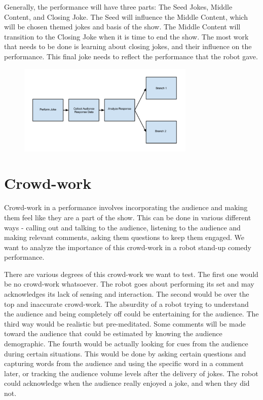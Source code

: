 \documentclass[onecolumn, draftclsnofoot,10pt, compsoc]{IEEEtran}
\begin{document}
Generally, the performance will have three parts: The Seed Jokes, Middle Content, and Closing Joke. The Seed will influence the Middle Content, which will be chosen themed jokes and basis of the show. The Middle Content will transition to the Closing Joke when it is time to end the show. The most work that needs to be done is learning about closing jokes, and their influence on the performance. This final joke needs to reflect the performance that the robot gave.
\begin{figure}[H]
  \centering
  \includegraphics[width=0.75\textwidth,height=0.75\textheight,keepaspectratio]{fig1}
  \caption{}
\end{figure}

\section{Crowd-work}
Crowd-work in a performance involves incorporating the audience and making them feel like they are a part of the show. This can be done in various different ways -  calling out and talking to the audience, listening to the audience and making relevant comments, asking them questions to keep them engaged. We want to analyze the importance of this crowd-work in a robot stand-up comedy performance. 

There are various degrees of this crowd-work we want to test. The first one would be no crowd-work whatsoever. The robot goes about performing its set and may acknowledges its lack of sensing and interaction. The second would be over the top and inaccurate crowd-work. The absurdity of a robot trying to understand the audience and being completely off could be entertaining for the audience. The third way would be realistic but pre-meditated. Some comments will be made toward the audience that could be estimated by knowing the audience demographic. The fourth would be actually looking for cues from the audience during certain situations. This would be done by asking certain questions and capturing words from the audience and using the specific word in a comment later, or tracking the audience volume levels after the delivery of jokes. The robot could acknowledge when the audience really enjoyed a joke, and when they did not. 
\end{document}
